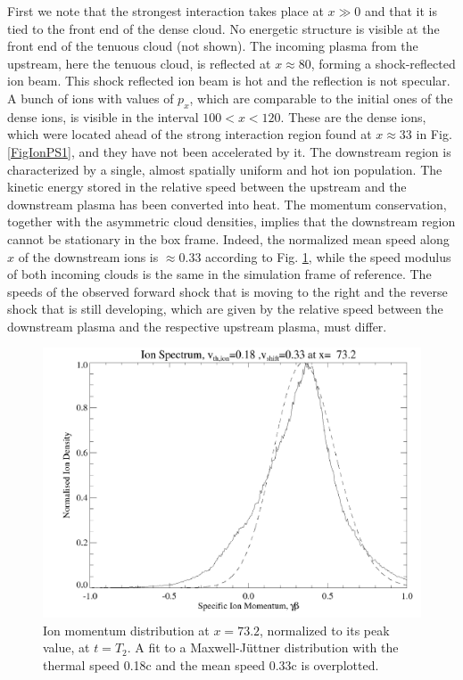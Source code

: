 \documentclass[structabstract]{aa}
\begin{document}
First we note that the strongest interaction takes place at $x\gg 0$ and that it is tied to the front end of the
dense cloud. No energetic structure is visible at the front end of the tenuous cloud (not shown). The incoming 
plasma from the upstream, here the tenuous cloud, is reflected at $x\approx 80$, forming a shock-reflected ion 
beam. This shock reflected ion beam is hot and the reflection is not specular. A bunch of ions with values of 
$p_x$, which are comparable to the initial ones of the dense ions, is visible in the interval $100<x<120$. These 
are the dense ions, which were located ahead of the strong interaction region found at $x\approx 33$ in Fig. 
\ref{FigIonPS1}, and they have not been accelerated by it. The downstream region is characterized by a single, 
almost spatially uniform and hot ion population. The kinetic energy stored in the relative speed between the 
upstream and the downstream plasma has been converted into heat. The momentum conservation, together with the 
asymmetric cloud densities, implies that the downstream region cannot be stationary in the box frame. Indeed, 
the normalized mean speed along $x$ of the downstream ions is $\approx 0.33$ according to Fig. 
\ref{FigJuttnerIont2}, while the speed modulus of both incoming clouds is the same in the simulation frame of 
reference. The speeds of the observed forward shock that is moving to the right and the reverse shock that is 
still developing, which are given by the relative speed between the downstream plasma and the respective upstream 
plasma, must differ. 
\begin{figure}
\centering
\includegraphics[width=\columnwidth]{15294f10.png}
\caption{Ion momentum distribution at $x=73.2$, normalized to its peak value, at $t=T_2$. A fit to a 
Maxwell-J\"uttner distribution with the thermal speed 0.18c and the mean speed 0.33c is overplotted.}
\label{FigJuttnerIont2}
\end{figure}
\end{document}
